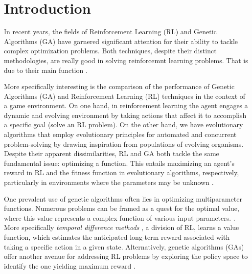 \section{Introduction}

In recent years, the fields of Reinforcement Learning (RL) and Genetic Algorithms (GA) have garnered significant attention for their ability to tackle complex optimization problems. Both techniques, despite their distinct methodologies, are really good in solving reinforcemnt learning problems. That is due to their main function  \cite{taylor2006comparing}. 


More specifically interesting is the comparison of the performance of Genetic Algorithms (GA) and Reinforcement Learning (RL) techniques in the context of a game environment. On one hand, in reinforcement learning the agent engages a dynamic and evolving environment by taking actions that affect it to accomplish a specific goal (solve an RL problem). On the other hand, we have evolutionary algorithms that employ evolutionary principles for automated and concurrent problem-solving by drawing inspiration from populations of evolving organisms. Despite their apparent dissimilarities, RL and GA both tackle the same fundamental issue: optimizing a function. This entails maximizing an agent's reward in RL and the fitness function in evolutionary algorithms, respectively, particularly in environments where the parameters may be unknown \cite{drugan2019reinforcement}.  

 One prevalent use of genetic algorithms often lies in optimizing multiparameter functions. Numerous problems can be framed as a quest for the optimal value, where this value represents a complex function of various input parameters. \cite{forrest1996genetic}. More specifically \textit{temporal difference methods} , a division of RL,  learns a value function, which estimates the anticipated long-term reward associated with taking a specific action in a given state. Alternatively, genetic algorithms (GAs) offer another avenue for addressing RL problems by exploring the policy space to identify the one yielding maximum reward \cite{taylor2006comparing}. 

